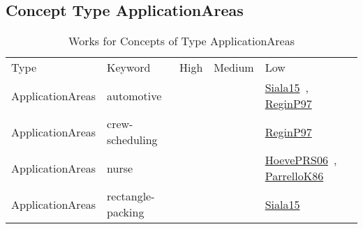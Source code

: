 \clearpage
\subsection{Concept Type ApplicationAreas}
\label{sec:ApplicationAreas}
{\scriptsize
\begin{longtable}{lp{3cm}>{\raggedright\arraybackslash}p{6cm}>{\raggedright\arraybackslash}p{6cm}>{\raggedright\arraybackslash}p{8cm}}
\rowcolor{white}\caption{Works for Concepts of Type ApplicationAreas}\\ \toprule
\rowcolor{white}Type & Keyword & High & Medium & Low\\ \midrule\endhead
\bottomrule
\endfoot
ApplicationAreas & automotive &  &  & \href{../cars/works/Siala15.pdf}{Siala15}~\cite{Siala15}, \href{../cars/works/ReginP97.pdf}{ReginP97}~\cite{ReginP97}\\
ApplicationAreas & crew-scheduling &  &  & \href{../cars/works/ReginP97.pdf}{ReginP97}~\cite{ReginP97}\\
ApplicationAreas & nurse &  &  & \href{../cars/works/HoevePRS06.pdf}{HoevePRS06}~\cite{HoevePRS06}, \href{../cars/works/ParrelloK86.pdf}{ParrelloK86}~\cite{ParrelloK86}\\
ApplicationAreas & rectangle-packing &  &  & \href{../cars/works/Siala15.pdf}{Siala15}~\cite{Siala15}\\
\end{longtable}
}


